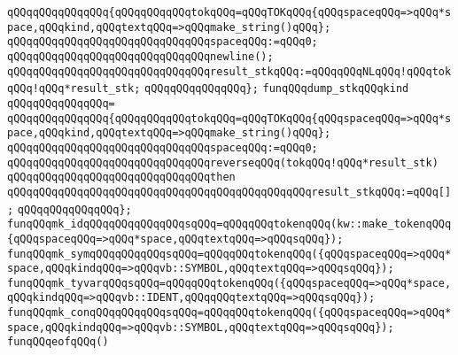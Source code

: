 \verb|qQQqqQQqqQQqqQQq{qQQqqQQqqQQqtokqQQq=qQQqTOKqQQq{qQQqspaceqQQq=>qQQq*space,qQQqkind,qQQqtextqQQq=>qQQqmake_string()qQQq};|\newline
\newline
\verb|qQQqqQQqqQQqqQQqqQQqqQQqqQQqqQQqspaceqQQq:=qQQq0;|\newline
\verb|qQQqqQQqqQQqqQQqqQQqqQQqqQQqqQQqnewline();|\newline
\verb|qQQqqQQqqQQqqQQqqQQqqQQqqQQqqQQqresult_stkqQQq:=qQQqqQQqNLqQQq!qQQqtokqQQq!qQQq*result_stk;|\newline
\verb|qQQqqQQqqQQqqQQq};|\newline
\newline
\verb|funqQQqdump_stkqQQqkind|\newline
\verb|qQQqqQQqqQQqqQQq=|\newline
\verb|qQQqqQQqqQQqqQQq{qQQqqQQqqQQqtokqQQq=qQQqTOKqQQq{qQQqspaceqQQq=>qQQq*space,qQQqkind,qQQqtextqQQq=>qQQqmake_string()qQQq};|\newline
\newline
\verb|qQQqqQQqqQQqqQQqqQQqqQQqqQQqqQQqspaceqQQq:=qQQq0;|\newline
\newline
\verb|qQQqqQQqqQQqqQQqqQQqqQQqqQQqqQQqreverseqQQq(tokqQQq!qQQq*result_stk)|\newline
\verb|qQQqqQQqqQQqqQQqqQQqqQQqqQQqqQQqthen|\newline
\verb|qQQqqQQqqQQqqQQqqQQqqQQqqQQqqQQqqQQqqQQqqQQqqQQqresult_stkqQQq:=qQQq[];|\newline
\verb|qQQqqQQqqQQqqQQq};|\newline
\newline
\verb|funqQQqmk_idqQQqqQQqqQQqqQQqsqQQq=qQQqqQQqtokenqQQq(kw::make_tokenqQQq{qQQqspaceqQQq=>qQQq*space,qQQqtextqQQq=>qQQqsqQQq});|\newline
\newline
\verb|funqQQqmk_symqQQqqQQqqQQqsqQQq=qQQqqQQqtokenqQQq({qQQqspaceqQQq=>qQQq*space,qQQqkindqQQq=>qQQqvb::SYMBOL,qQQqtextqQQq=>qQQqsqQQq});|\newline
\verb|funqQQqmk_tyvarqQQqsqQQq=qQQqqQQqtokenqQQq({qQQqspaceqQQq=>qQQq*space,qQQqkindqQQq=>qQQqvb::IDENT,qQQqqQQqtextqQQq=>qQQqsqQQq});|\newline
\verb|funqQQqmk_conqQQqqQQqqQQqsqQQq=qQQqqQQqtokenqQQq({qQQqspaceqQQq=>qQQq*space,qQQqkindqQQq=>qQQqvb::SYMBOL,qQQqtextqQQq=>qQQqsqQQq});|\newline
\newline
\verb|funqQQqeofqQQq()|\newline
